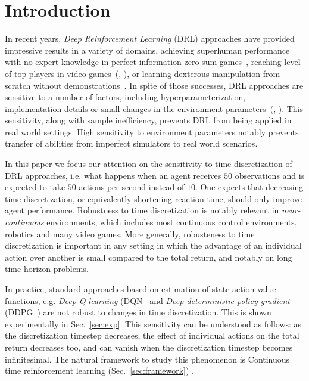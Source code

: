 
\section{Introduction}
\label{sec:intro}
In recent years, \emph{Deep Reinforcement Learning} (DRL) approaches have
provided impressive results in a variety of domains, achieving superhuman
performance with no expert knowledge in perfect information zero-sum
games~\cite{alphazero}, reaching level of top players in video
games~(\citealt{openai_five}, \citealt{dqn}), or learning dexterous manipulation
from scratch without demonstrations~\cite{hand_control}. 
In spite of those successes, DRL approaches are
sensitive to a number of factors, including hyperparameterization,
implementation details or small changes in the environment
parameters~(\citealt{drl_matter}, \citealt{drl_matter_bis}). This sensitivity,
along with sample inefficiency, prevents DRL from being applied in real
world settings. High sensitivity to environment parameters notably prevents
transfer of abilities from imperfect simulators to real world scenarios.

In this paper we focus our attention on the sensitivity to time discretization
of DRL approaches,
i.e. what happens when an agent receives $50$ observations
and is expected to take $50$ actions per second instead of $10$. One expects
that decreasing time discretization, or equivalently shortening reaction time,
should only improve agent performance. Robustness to time discretization is notably relevant in \emph{near-continuous}
environments, which includes most continuous control environments, robotics and many video games.
More generally, robusteness to time discretization is important in any setting in which the advantage
of an individual action over another is small compared to the total return, and notably on long time horizon
problems.

In practice, standard approaches based on estimation of state action value functions, e.g.
\emph{Deep Q-learning} (DQN~\citep{dqn} and \emph{Deep deterministic policy
gradient} (DDPG~\citep{ddpg}) are not robust to changes in time discretization. This is shown experimentally in Sec.~\ref{sec:exp}. 
This sensitivity can be understood as follows: as the discretization timestep
decreases, the effect of individual actions on the total return decreases too, and
can vanish when the discretization timestep becomes infinitesimal. The natural
framework to study this phenomenon is Continuous time reinforcement learning 
(Sec.~\ref{sec:framework}) \cite{cont_rl, adv_upd}.

